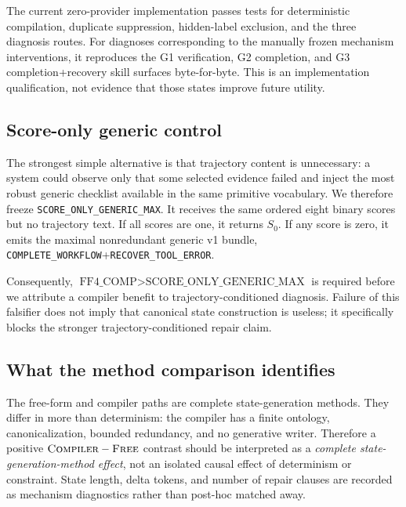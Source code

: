 The current zero-provider implementation passes tests for deterministic compilation, duplicate suppression, hidden-label exclusion, and the three diagnosis routes. For diagnoses corresponding to the manually frozen mechanism interventions, it reproduces the G1 verification, G2 completion, and G3 completion+recovery skill surfaces byte-for-byte. This is an implementation qualification, not evidence that those states improve future utility.

\subsection{Score-only generic control}
The strongest simple alternative is that trajectory content is unnecessary: a system could observe only that some selected evidence failed and inject the most robust generic checklist available in the same primitive vocabulary. We therefore freeze \texttt{SCORE\_ONLY\_GENERIC\_MAX}. It receives the same ordered eight binary scores but no trajectory text. If all scores are one, it returns $S_0$. If any score is zero, it emits the maximal nonredundant generic v1 bundle, \texttt{COMPLETE\_WORKFLOW}+\texttt{RECOVER\_TOOL\_ERROR}.

Consequently, $\text{FF4\_COMP}>\text{SCORE\_ONLY\_GENERIC\_MAX}$ is required before we attribute a compiler benefit to trajectory-conditioned diagnosis. Failure of this falsifier does not imply that canonical state construction is useless; it specifically blocks the stronger trajectory-conditioned repair claim.

\subsection{What the method comparison identifies}
The free-form and compiler paths are complete state-generation methods. They differ in more than determinism: the compiler has a finite ontology, canonicalization, bounded redundancy, and no generative writer. Therefore a positive $\textsc{Compiler}-\textsc{Free}$ contrast should be interpreted as a \emph{complete state-generation-method effect}, not an isolated causal effect of determinism or constraint. State length, delta tokens, and number of repair clauses are recorded as mechanism diagnostics rather than post-hoc matched away.
